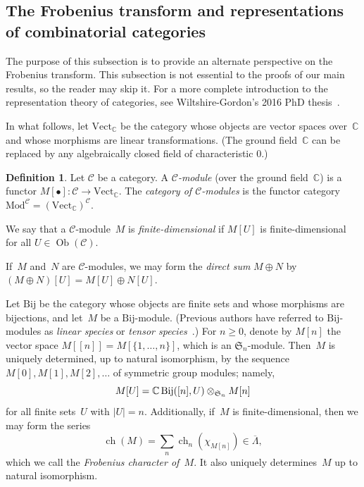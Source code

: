 \documentclass[11pt]{article}
\theoremstyle{definition}
\newtheorem{defi}[theo]{Definition}
\numberwithin{equation}{section}
\newcommand{\K}{\mathbb{C}}
\newcommand{\Vect}{\text{Vect}}
\newcommand{\Mod}{\mathrm{Mod}}
\newcommand{\Bij}{\mathchoice{\operatorname{Bij}}{\operatorname{Bij}}{\mathrm{Bij}}{\mathrm{Bij}}}
\newcommand{\rmBij}{\mathrm{Bij}}
\newcommand{\Sym}{\mathfrak{S}}
\DeclareMathOperator{\ch}{ch}
\begin{document}
\subsection{The Frobenius transform and representations of combinatorial categories}\label{subsection:category}
The purpose of this subsection is to provide an alternate perspective on the Frobenius transform. This subsection is not essential to the proofs of our main results, so the reader may skip it. For a more complete introduction to the representation theory of categories, see Wiltshire-Gordon's 2016 PhD thesis~\cite{MR3641124}.

In what follows, let $\Vect_\K$ be the category whose objects are vector spaces over~$\K$ and whose morphisms are linear transformations. (The ground field~$\K$ can be replaced by any algebraically closed field of characteristic $0$.)

\begin{defi}
    Let $\mathcal{C}$ be a category. A \emph{$\mathcal{C}$-module} (over the ground field~$\K$) is a functor $M[\bullet] \colon \mathcal{C} \to \Vect_\K$. The \emph{category of $\mathcal{C}$-modules} is the functor category $\Mod^\mathcal{C} = (\Vect_\K)^\mathcal{C}$.
    
    We say that a $\mathcal{C}$-module~$M$ is \emph{finite-dimensional} if $M[U]$ is finite-dimensional for all $U \in \operatorname{Ob}(\mathcal{C})$.

    If~$M$ and~$N$ are $\mathcal{C}$-modules, we may form the \emph{direct sum} $M \oplus N$ by $(M \oplus N)[U] = M[U] \oplus N[U]$.
\end{defi}

Let $\rmBij$ be the category whose objects are finite sets and whose morphisms are bijections, and let~$M$ be a $\rmBij$-module. (Previous authors have referred to $\rmBij$-modules as \emph{linear species} or \emph{tensor species}~\cite{MR0927763, MR1132426}.) For $n \geq 0$, denote by $M[n]$ the vector space $M[[n]] = M[\{1, \ldots, n\}]$, which is an $\Sym_n$-module. Then~$M$ is uniquely determined, up to natural isomorphism, by the sequence $M[0], M[1], M[2], \ldots$ of symmetric group modules; namely, 
\begin{equation}\label{equation:bmodule}
M[U] = \K \Bij([n], U) \otimes_{\Sym_n} M[n]
\end{equation} for all finite sets~$U$ with $|U| = n$.
Additionally, if~$M$ is finite-dimensional, then we may form the series
\[\ch(M) = \sum_{n} \ch_n(\chi_{M[n]}) \in \overline{\Lambda},\] which we call the \emph{Frobenius character of~$M$}. It also uniquely determines~$M$ up to natural isomorphism.
\end{document}
